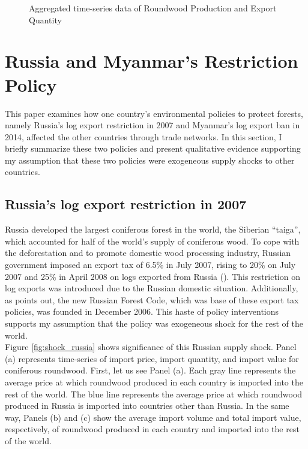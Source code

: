 \documentclass[a4paper,12pt]{article}
\begin{document}
\begin{figure}[H]
    \centering
    \caption{Aggregated time-series data of Roundwood Production and Export Quantity}
    \label{fig:time_series}
\end{figure}

\section{Russia and Myanmar's Restriction Policy}
This paper examines how one country's environmental policies to protect forests, namely Russia's log export restriction in 2007 and Myanmar's log export ban in 2014, affected the other countries through trade networks. In this section, I briefly summarize these two policies and present qualitative evidence supporting my assumption that these two policies were exogeneous supply shocks to other countries.

\subsection{Russia's log export restriction in 2007}
Russia developed the largest coniferous forest in the world, the Siberian ``taiga'', which accounted for half of the world's supply of coniferous wood.  To cope with the deforestation and to promote domestic wood processing industry, Russian government imposed an export tax of 6.5\% in July 2007, rising to 20\% on July 2007 and 25\% in April 2008 on logs exported from Russia (\cite{lin2017incidence}). This restriction on log exports was introduced due to the Russian domestic situation. Additionally, as \cite{meti} points out, the new Russian Forest Code, which was base of these export tax policies, was founded in December 2006. This haste of policy interventions supports my assumption that the policy was exogeneous shock for the rest of the world. \\

Figure \ref{fig:shock_russia} shows significance of this Russian supply shock. Panel (a) represents time-series of import price, import quantity, and import value for coniferous roundwood. First, let us see Panel (a). Each gray line represents the average price at which roundwood produced in each country is imported into the rest of the world. The blue line represents the average price at which roundwood produced in Russia is imported into countries other than Russia. In the same way, Panels (b) and (c) show the average import volume and total import value, respectively, of roundwood produced in each country and imported into the rest of the world.
\end{document}
